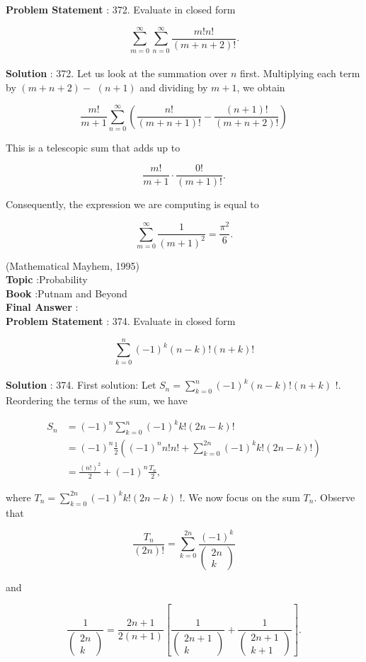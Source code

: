 \documentclass[10pt]{article}
\begin{document}
\textbf{Problem Statement} :
372. Evaluate in closed form

$$
\sum_{m=0}^{\infty} \sum_{n=0}^{\infty} \frac{m ! n !}{(m+n+2) !} .
$$
\\
\textbf{Solution} :
372. Let us look at the summation over $n$ first. Multiplying each term by $(m+n+2)-$ $(n+1)$ and dividing by $m+1$, we obtain

$$
\frac{m !}{m+1} \sum_{n=0}^{\infty}\left(\frac{n !}{(m+n+1) !}-\frac{(n+1) !}{(m+n+2) !}\right)
$$

This is a telescopic sum that adds up to

$$
\frac{m !}{m+1} \cdot \frac{0 !}{(m+1) !} .
$$

Consequently, the expression we are computing is equal to

$$
\sum_{m=0}^{\infty} \frac{1}{(m+1)^{2}}=\frac{\pi^{2}}{6} .
$$

(Mathematical Mayhem, 1995)
\\
\textbf{Topic} :Probability\\
\textbf{Book} :Putnam and Beyond\\
\textbf{Final Answer} :\\


\textbf{Problem Statement} :
374. Evaluate in closed form

$$
\sum_{k=0}^{n}(-1)^{k}(n-k) !(n+k) !
$$
\\
\textbf{Solution} :
374. First solution: Let $S_{n}=\sum_{k=0}^{n}(-1)^{k}(n-k) !(n+k)$ !. Reordering the terms of the sum, we have

$$
\begin{aligned}
S_{n} &=(-1)^{n} \sum_{k=0}^{n}(-1)^{k} k !(2 n-k) ! \\
&=(-1)^{n} \frac{1}{2}\left((-1)^{n} n ! n !+\sum_{k=0}^{2 n}(-1)^{k} k !(2 n-k) !\right) \\
&=\frac{(n !)^{2}}{2}+(-1)^{n} \frac{T_{n}}{2},
\end{aligned}
$$

where $T_{n}=\sum_{k=0}^{2 n}(-1)^{k} k !(2 n-k)$ !. We now focus on the sum $T_{n}$. Observe that

$$
\frac{T_{n}}{(2 n) !}=\sum_{k=0}^{2 n} \frac{(-1)^{k}}{\left(\begin{array}{c}
2 n \\
k
\end{array}\right)}
$$

and

$$
\frac{1}{\left(\begin{array}{c}
2 n \\
k
\end{array}\right)}=\frac{2 n+1}{2(n+1)}\left[\frac{1}{\left(\begin{array}{c}
2 n+1 \\
k
\end{array}\right)}+\frac{1}{\left(\begin{array}{c}
2 n+1 \\
k+1
\end{array}\right)}\right] .
$$
\end{document}
